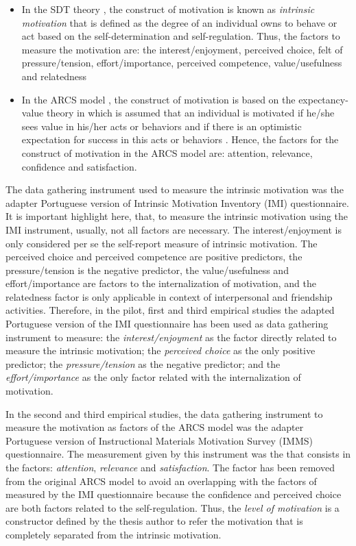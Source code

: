 \begin{itemize}
\item
In the SDT theory \cite{RyanDeci2000}, the construct of motivation is known as \emph{intrinsic motivation} that is defined as the degree of an individual owns to behave or act based on the self-determination and self-regulation.
Thus, the factors to measure the motivation are: the interest/enjoyment, perceived choice, felt of pressure/tension, effort/importance, perceived competence, value/usefulness and relatedness

\item
In the ARCS model \cite{Keller2009}, the construct of motivation is based on the expectancy-value theory in which is assumed that an individual is motivated if he/she sees value in his/her acts or behaviors and if there is an optimistic expectation for success in this acts or behaviors \cite{Wigfield1994}.
Hence, the factors for the construct of motivation in the ARCS model are: attention, relevance, confidence and satisfaction.
\end{itemize}

The data gathering instrument used to measure the intrinsic motivation was the adapter Portuguese version of Intrinsic Motivation Inventory (IMI) questionnaire.
It is important highlight here, that, to measure the intrinsic motivation using the IMI instrument, usually, not all factors are necessary.
The interest/enjoyment is only considered per se the self-report measure of intrinsic motivation.
The perceived choice and perceived competence are positive predictors, the pressure/tension is the negative predictor, the value/usefulness and effort/importance are factors to the internalization of motivation, and the relatedness factor is only applicable in context of interpersonal and friendship activities.
Therefore, in the pilot, first and third empirical studies the adapted Portuguese version of the IMI questionnaire has been used as data gathering instrument to measure:
the \emph{interest/enjoyment} as the factor directly related to measure the intrinsic motivation;
the \emph{perceived choice} as the only positive predictor;
the \emph{pressure/tension} as the negative predictor; and
the \emph{effort/importance} as the only factor related with the internalization of motivation.

In the second and third empirical studies, the data gathering instrument to measure the motivation as factors of the ARCS model was the adapter Portuguese version of Instructional Materials Motivation Survey (IMMS) questionnaire.
The measurement given by this instrument was the  that consists in the factors: \emph{attention}, \emph{relevance} and \emph{satisfaction}.
The  factor has been removed from the original ARCS model to avoid an overlapping with the factors of  measured by the IMI questionnaire because the confidence and perceived choice are both factors related to the self-regulation.
Thus, the \emph{level of motivation} is a constructor defined by the thesis author to refer the motivation that is completely separated from the intrinsic motivation.

